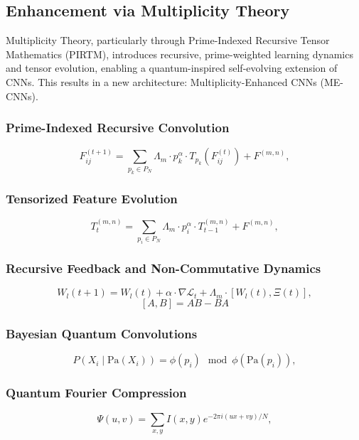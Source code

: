 \documentclass{article}
\theoremstyle{plain}
\begin{document}
\subsection{Enhancement via Multiplicity Theory}

Multiplicity Theory, particularly through Prime-Indexed Recursive Tensor Mathematics (PIRTM), introduces recursive, prime-weighted learning dynamics and tensor evolution, enabling a quantum-inspired self-evolving extension of CNNs. This results in a new architecture: Multiplicity-Enhanced CNNs (ME-CNNs).

\subsubsection{Prime-Indexed Recursive Convolution}
\begin{equation}
F_{ij}^{(t+1)} = \sum_{p_k \in P_N} \Lambda_m \cdot p_k^{\alpha} \cdot T_{p_k}(F_{ij}^{(t)}) + F^{(m,n)},
\end{equation}

\subsubsection{Tensorized Feature Evolution}
\begin{equation}
T_t^{(m,n)} = \sum_{p_i \in P_N} \Lambda_m \cdot p_i^\alpha \cdot T_{t-1}^{(m,n)} + F^{(m,n)},
\end{equation}

\subsubsection{Recursive Feedback and Non-Commutative Dynamics}
\begin{equation}
W_l(t+1) = W_l(t) + \alpha \cdot \nabla \mathcal{L}_t + \Lambda_m \cdot [W_l(t), \Xi(t)],
\end{equation}
\[
[A, B] = AB - BA
\]

\subsubsection{Bayesian Quantum Convolutions}
\begin{equation}
P(X_i \mid \text{Pa}(X_i)) = \phi(p_i) \mod \phi(\text{Pa}(p_i)),
\end{equation}

\subsubsection{Quantum Fourier Compression}
\begin{equation}
\Psi(u,v) = \sum_{x,y} I(x,y) e^{-2\pi i (ux + vy)/N},
\end{equation}
\end{document}
